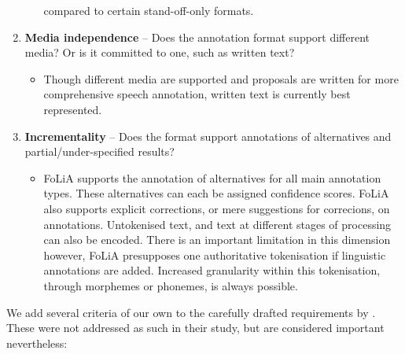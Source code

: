 \documentclass[a4paper,10pt,twoside]{article}
\begin{document}
\begin{enumerate}
\begin{itemize}
      compared to certain stand-off-only formats. 
  \end{itemize}
\item \textbf{Media independence} -- Does the annotation format support
  different media? Or is it committed to one, such as written text?
  \begin{itemize}
    \item[] Though different media are supported and proposals are written
      for more comprehensive speech annotation, written text is currently best
      represented. 
   \end{itemize}
\item \textbf{Incrementality} -- Does the format support annotations of
  alternatives and partial/under-specified results? 
   \begin{itemize} 
     \item[] FoLiA supports the annotation of alternatives for all
    main annotation types. These alternatives can each be assigned confidence
    scores. FoLiA also supports explicit corrections, or mere suggestions for
    correcions, on annotations.
    Untokenised text, and text at different stages of processing can also be
    encoded. There is an important limitation in this dimension however, FoLiA
    presupposes one authoritative tokenisation if linguistic annotations are
    added. Increased granularity within this tokenisation, through morphemes or
    phonemes, is always possible.
  \end{itemize}
   \setcounter{enumTemp}{\theenumi}
\end{enumerate}

We add several criteria of our own to the carefully drafted requirements by
. These were not addressed as such in their study, but are
considered important nevertheless:
\end{document}
